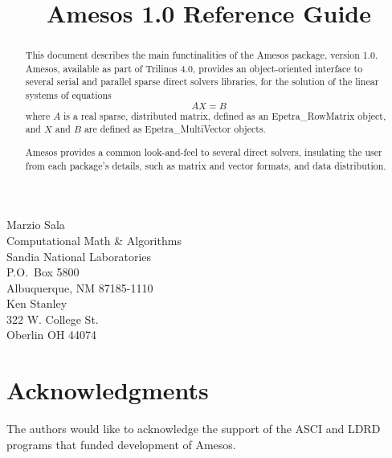 \documentclass[11pt]{SANDreport}
\title{Amesos 1.0 Reference Guide}
\begin{document}
\maketitle

\begin{center}
Marzio  Sala \\
Computational Math \& Algorithms \\
Sandia National Laboratories\\
P.O.~Box 5800 \\
Albuquerque, NM 87185-1110
\\[30pt]
Ken Stanley\\
322 W. College St.\\
Oberlin OH 44074
\end{center}

\vspace{20pt}

\begin{abstract}
  
  This document describes the main functinalities of the Amesos package,
  version 1.0. Amesos, available as part of Trilinos 4.0, provides an
  object-oriented interface to several serial and parallel sparse direct
  solvers libraries, for the solution of the linear systems of equations
  \begin{equation}
    \label{eq:linear_system}
    A X = B
  \end{equation}
  where $A$ is a real sparse, distributed matrix, defined as an
  Epetra\_RowMatrix object, and $X$ and $B$ are defined as
  Epetra\_MultiVector objects.
  
  Amesos provides a common look-and-feel to several direct solvers,
  insulating the user from each package's details, such as matrix and
  vector formats, and data distribution.
\end{abstract}

\clearpage

\clearpage

\section*{Acknowledgments}
The authors would like to acknowledge the support of the ASCI and LDRD programs
that funded development of Amesos.

\smallskip


\smallskip

\end{document}
